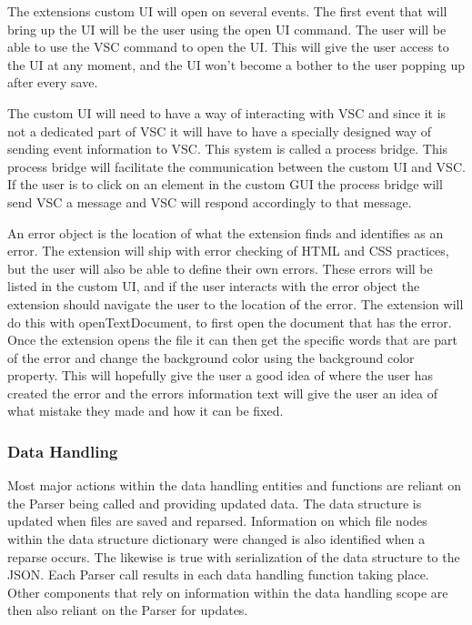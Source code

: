 \documentclass[letterpaper,10pt,titlepage,draftclsnofoot,onecolumn,onesided] {IEEEtran}
\begin{document}
The extensions custom UI will open on several events. 
The first event that will bring up the UI will be the user using the open UI command. 
The user will be able to use the VSC command to open the UI. 
This will give the user access to the UI at any moment, and the UI won't become a bother to the user popping up after every save. 

The custom UI will need to have a way of interacting with VSC and since it is not a dedicated part of VSC it will have to have a specially designed way of sending event information to VSC. 
This system is called a process bridge. 
This process bridge will facilitate the communication between the custom UI and VSC.
If the user is to click on an element in the custom GUI the process bridge will send VSC a message and VSC will respond accordingly to that message. 

An error object is the location of what the extension finds and identifies as an error.
The extension will ship with error checking of HTML and CSS practices, but the user will also be able to define their own errors. 
These errors will be listed in the custom UI, and if the user interacts with the error object the extension should navigate the user to the location of the error.
The extension will do this with openTextDocument, to first open the document that has the error. 
Once the extension opens the file it can then get the specific words that are part of the error and change the background color using the background color property. \cite{VSCodeDocumentation}
This will hopefully give the user a good idea of where the user has created the error and the errors information text will give the user an idea of what mistake they made and how it can be fixed.

\subsubsection{Data Handling}
Most major actions within the data handling entities and functions are reliant on the Parser being called and providing updated data.
The data structure is updated when files are saved and reparsed. 
Information on which file nodes within the data structure dictionary were changed is also identified when a reparse occurs.
The likewise is true with serialization of the data structure to the JSON.
Each Parser call results in each data handling function taking place. 
Other components that rely on information within the data handling scope are then also reliant on the Parser for updates.
	
\end{document}
